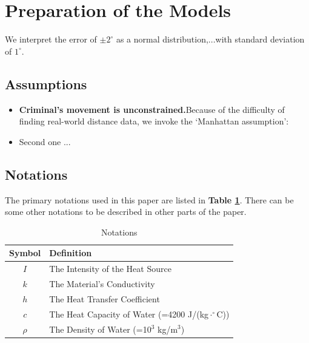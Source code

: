 \section{Preparation of the Models}
We interpret the error of $\pm2^\circ$ as a normal distribution,...with standard deviation of $1^\circ$.

\subsection{Assumptions}
\begin{itemize}                %
    \item  \textbf{Criminal's movement is unconstrained.}Because of the difficulty of finding real-world distance data, we invoke the ‘Manhattan assumption’:
    \item Second one ...
\end{itemize}

\subsection{Notations}
The primary notations used in this paper are listed in \textbf{Table \ref{tb:notations}}. There can be some other notations to be described in other parts of the paper.
\begin{table}[!htbp]
\centering
\caption{Notations}
\begin{tabular}{cl}
	\toprule
	\multicolumn{1}{m{3cm}}{\centering Symbol}
	&\multicolumn{1}{m{8cm}}{\centering Definition}\\
	\midrule
	$I$&The Intensity of the Heat Source\\
	$k$&The Material's Conductivity\\
	$h$&The Heat Transfer Coefficient\\
	$c$&The Heat Capacity of Water (=4200 J/(kg$\cdot^\circ$C))\\
	$\rho$&The Density of Water (=10$^3$ kg/m$^3$)\\
	
	\bottomrule
\end{tabular}
\label{tb:notations}
\end{table}

